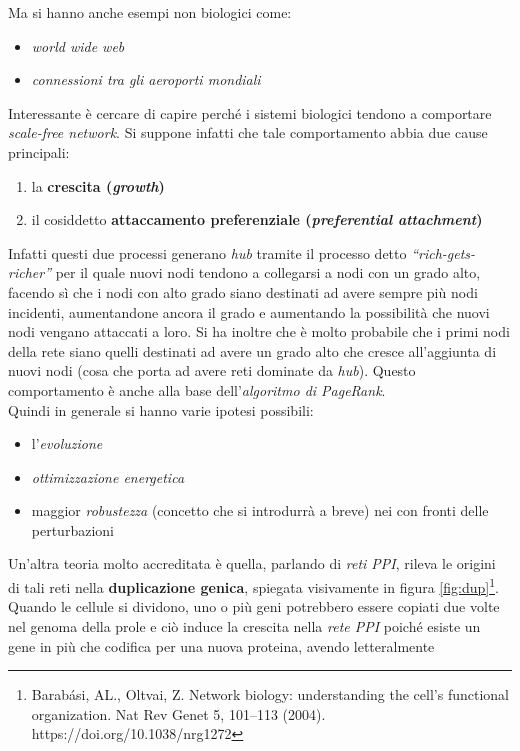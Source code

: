 \documentclass[a4paper,12pt, oneside]{book}
\begin{document}
Ma si hanno anche esempi non biologici come:
\begin{itemize}
  \item \textit{world wide web}
  \item \textit{connessioni tra gli aeroporti mondiali}
\end{itemize}
Interessante è cercare di capire perché i sistemi biologici tendono a comportare
\textit{scale-free network}. Si suppone infatti che tale comportamento abbia
due cause principali:
\begin{enumerate}
  \item la \textbf{crescita (\textit{growth})}
  \item il cosiddetto \textbf{attaccamento preferenziale (\textit{preferential
      attachment})} 
\end{enumerate}
Infatti questi due processi generano \textit{hub} tramite il processo detto
\textit{``rich-gets-richer''} per il quale nuovi nodi tendono a collegarsi a
nodi con un grado alto, facendo sì che i nodi con alto grado siano destinati ad
avere sempre più nodi incidenti, aumentandone ancora il grado e aumentando la
possibilità che nuovi nodi vengano attaccati a loro. Si ha inoltre che è molto
probabile che i primi nodi della rete siano quelli destinati ad avere un grado
alto che cresce all'aggiunta di nuovi nodi (cosa che porta ad avere reti
dominate da \textit{hub}). Questo comportamento è anche alla base
dell'\textit{algoritmo di PageRank}. \\
Quindi in generale si hanno varie ipotesi possibili:
\begin{itemize}
  \item l'\textit{evoluzione}
  \item \textit{ottimizzazione energetica}
  \item maggior \textit{robustezza} (concetto che si introdurrà a breve) nei con
  fronti delle perturbazioni
\end{itemize}
Un'altra teoria molto accreditata è quella, parlando di \textit{reti PPI},
rileva le origini di tali reti nella \textbf{duplicazione genica}, spiegata
visivamente in figura \ref{fig:dup}\footnote{Barabási, AL., Oltvai, Z. Network
  biology: understanding the cell's functional organization. Nat Rev Genet 5,
  101–113 (2004). https://doi.org/10.1038/nrg1272}. Quando le 
cellule si dividono, uno o più geni potrebbero essere copiati due volte nel
genoma della prole e ciò induce la crescita nella \textit{rete PPI} poiché
esiste un gene in più che codifica per una nuova proteina, avendo letteralmente
\end{document}
